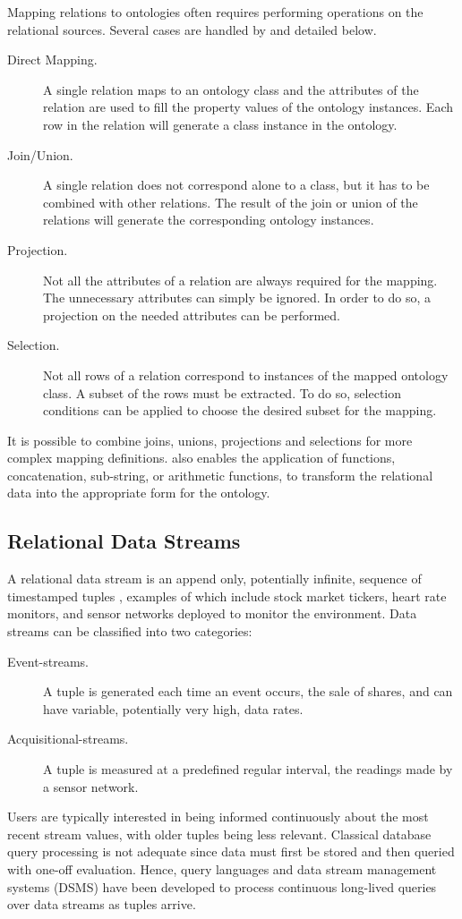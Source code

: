 Mapping relations to ontologies often requires performing operations on the relational sources.
Several cases are handled by \rtwoo and detailed below.
\begin{description}
\item[Direct Mapping.] A single relation maps to an ontology class and the attributes of the relation are used to fill the property values of the ontology instances. Each row in the relation will generate a class instance in the ontology.
\item[Join/Union.] A single relation does not correspond alone to a class, but it has to be combined with other relations. The result of the join or union of the relations will generate the corresponding ontology instances.
\item[Projection.] Not all the attributes of a relation are always required for the mapping. The unnecessary attributes can simply be ignored. In order to do so, a projection on the needed attributes can be performed.
\item[Selection.] Not all rows of a relation correspond to instances of the mapped ontology class. A subset of the rows must be extracted. To do so, selection conditions can be applied to choose the desired subset for the mapping.
\end{description}
It is possible to combine joins, unions, projections and selections for more complex mapping definitions.
\rtwoo also enables the application of functions, \eg concatenation, sub-string, or arithmetic functions, to transform the relational data into the appropriate form for the ontology.



\subsection{Relational Data Streams}
\label{sec:query-relat-streams}

A relational data stream is an append only, potentially infinite, sequence of timestamped tuples \cite{Golab2003Issues-in-data-}, examples of which include stock market tickers, heart rate monitors, and sensor networks deployed to monitor the environment.
Data streams can be classified into two categories:
\begin{description}
\item[Event-streams.] A tuple is generated each time an event occurs, \eg the sale of shares, and can have variable, potentially very high, data rates.
\item[Acquisitional-streams.] A tuple is measured at a predefined regular interval, \eg the readings made by a sensor network.
\end{description}
Users are typically interested in being informed continuously about the most recent stream values, with older tuples being less relevant.
Classical database query processing is not adequate since data must first be stored and then queried with one-off evaluation.
Hence, query languages \cite{Brenninkmeijer_08,Arasu_2006} and data stream management systems (DSMS) \cite{Arasu_06a,Abadi_2005,Galpin_09,Madden_05} have been developed to process continuous long-lived queries over data streams as tuples arrive.


